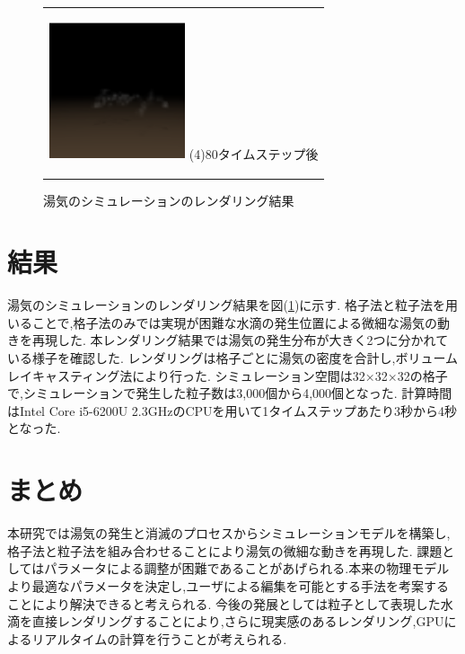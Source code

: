 \documentclass[submit,techrep]{ipsj}
\begin{document}
\begin{figure}[t]
\begin{center}
\begin{tabular}{c}
      \begin{minipage}{0.25\hsize}
        \begin{center}
          \includegraphics[clip, width=4cm]{./render_80.eps}
          \hspace{1.6cm}  (4)80タイムステップ後 
        \end{center}
      \end{minipage}  

    \end{tabular}
    \caption{湯気のシミュレーションのレンダリング結果}
    \label{result}
  \end{center}
\end{figure}

\section{結果}

湯気のシミュレーションのレンダリング結果を図(\ref{result})に示す.
格子法と粒子法を用いることで,格子法のみでは実現が困難な水滴の発生位置による微細な湯気の動きを再現した.
本レンダリング結果では湯気の発生分布が大きく2つに分かれている様子を確認した.
レンダリングは格子ごとに湯気の密度を合計し,ボリュームレイキャスティング法により行った.
シミュレーション空間は32×32×32の格子で,シミュレーションで発生した粒子数は3,000個から4,000個となった.
計算時間はIntel Core i5-6200U 2.3GHzのCPUを用いて1タイムステップあたり3秒から4秒となった.

\section{まとめ}
本研究では湯気の発生と消滅のプロセスからシミュレーションモデルを構築し,格子法と粒子法を組み合わせることにより湯気の微細な動きを再現した.
課題としてはパラメータによる調整が困難であることがあげられる.本来の物理モデルより最適なパラメータを決定し,ユーザによる編集を可能とする手法を考案することにより解決できると考えられる.
今後の発展としては粒子として表現した水滴を直接レンダリングすることにより,さらに現実感のあるレンダリング,GPUによるリアルタイムの計算を行うことが考えられる.


\end{document}
